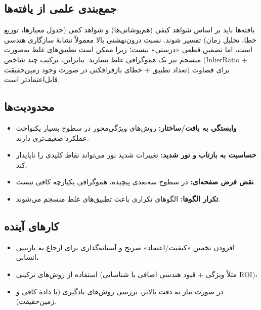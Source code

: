 
\subsection{جمع‌بندی علمی از یافته‌ها}
یافته‌ها باید بر اساس شواهد کیفی (هم‌پوشانی‌ها) و شواهد کمی (جدول معیارها، توزیع خطا، تحلیل زمان) تفسیر شوند. نسبت درون‌نهشتی بالا معمولاً نشانهٔ سازگاری هندسی است، اما تضمین قطعی «درستی» نیست؛ زیرا ممکن است تطبیق‌های غلط به‌صورت منسجم نیز یک هموگرافی غلط بسازند. بنابراین، ترکیب چند شاخص (InlierRatio + تعداد تطبیق + خطای بازفرافکنی در صورت وجود زمین‌حقیقت) برای قضاوت قابل‌اعتمادتر است.

\subsection{محدودیت‌ها}
\begin{itemize}
  \item \textbf{وابستگی به بافت/ساختار:} روش‌های ویژگی‌محور در سطوح بسیار یکنواخت عملکرد ضعیف‌تری دارند.
  \item \textbf{حساسیت به بازتاب و نور شدید:} تغییرات شدید نور می‌تواند نقاط کلیدی را ناپایدار کند.
  \item \textbf{نقض فرض صفحه‌ای:} در سطوح سه‌بعدی پیچیده، هموگرافی یکپارچه کافی نیست.
  \item \textbf{تکرار الگوها:} الگوهای تکراری باعث تطبیق‌های غلط منسجم می‌شوند.
\end{itemize}

\subsection{کارهای آینده}
\begin{itemize}
  \item افزودن تخمین «کیفیت/اعتماد» صریح و آستانه‌گذاری برای ارجاع به بازبینی انسانی،
  \item استفاده از روش‌های ترکیبی (مثلاً ویژگی + قیود هندسی اضافی یا شناسایی ROI)،
  \item در صورت نیاز به دقت بالاتر، بررسی روش‌های یادگیری (با دادهٔ کافی و زمین‌حقیقت).
\end{itemize}
